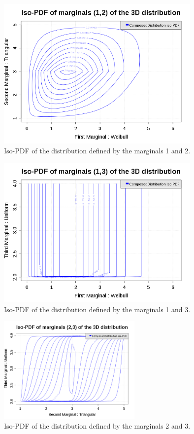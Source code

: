 \begin{figure}[H]
  \begin{center}
    \includegraphics[width=10cm]{ComposedDistribution_isoPDF_12.png}
  \end{center}
  \caption{Iso-PDF of the distribution defined by the marginals 1 and 2.}
  \label{Marginal12}
\end{figure}

\begin{figure}[H]
  \begin{center}
    \includegraphics[width=10cm]{ComposedDistribution_isoPDF_13.png}
  \end{center}
  \caption{Iso-PDF of the distribution defined by the marginals 1 and 3.}
  \label{Marginal13}
\end{figure}

\begin{figure}[H]
  \begin{center}
    \includegraphics[width=7cm]{ComposedDistribution_isoPDF_23.png}
  \end{center}
  \caption{Iso-PDF of the distribution defined by the marginals 2 and 3.}
  \label{Marginal23}
\end{figure}


